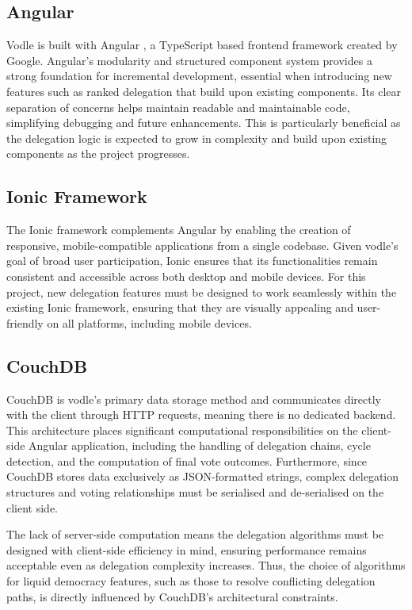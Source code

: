\subsection*{Angular}
Vodle is built with Angular \citep{angular}, a TypeScript based frontend framework created by Google. Angular's modularity and structured component system provides a strong foundation for incremental development, essential when introducing new features such as ranked delegation that build upon existing components. Its clear separation of concerns helps maintain readable and maintainable code, simplifying debugging and future enhancements. This is particularly beneficial as the delegation logic is expected to grow in complexity and build upon existing components as the project progresses.

\subsection*{Ionic Framework}
The Ionic \citep{ionic} framework complements Angular by enabling the creation of responsive, mobile-compatible applications from a single codebase. Given vodle's goal of broad user participation, Ionic ensures that its functionalities remain consistent and accessible across both desktop and mobile devices. %
For this project, new delegation features must be designed to work seamlessly within the existing Ionic framework, ensuring that they are visually appealing and user-friendly on all platforms, including mobile devices.

\subsection*{CouchDB}
CouchDB \citep{couchdb} is vodle's primary data storage method and communicates directly with the client through HTTP requests, meaning there is no dedicated backend. This architecture places significant computational responsibilities on the client-side Angular application, including the handling of delegation chains, cycle detection, and the computation of final vote outcomes. Furthermore, since CouchDB stores data exclusively as JSON-formatted strings, complex delegation structures and voting relationships must be serialised and de-serialised on the client side.

The lack of server-side computation means the delegation algorithms must be designed with client-side efficiency in mind, ensuring performance remains acceptable even as delegation complexity increases. Thus, the choice of algorithms for liquid democracy features, such as those to resolve conflicting delegation paths, is directly influenced by CouchDB's architectural constraints.

